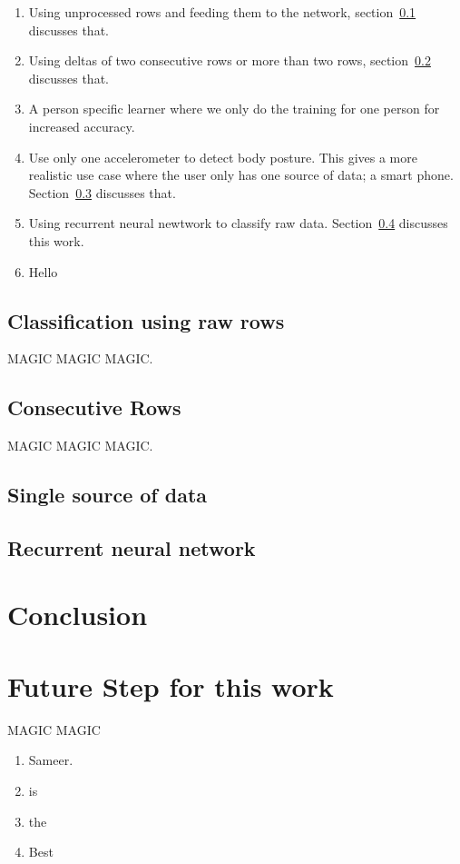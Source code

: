 \documentclass{article}
\begin{document}
\begin{enumerate}
  \item Using unprocessed rows and feeding them to the network, section~\ref{simple_rows} discusses that.
  \item Using deltas of two consecutive  rows or more than two rows, section~\ref{consecutive_rows} discusses that. 
  \item A person specific learner where we only do the training for one person for increased accuracy. 
  \item Use only one accelerometer to detect body posture. This gives a more realistic use case where the user only 
        has one source of data; a smart phone. Section~\ref{single_acc} discusses that.
  \item Using recurrent neural newtwork to classify raw data. Section~\ref{rec_neural} discusses this work.
  \item Hello 
\end{enumerate}  

\subsection{Classification using raw rows}
\label{simple_rows}
MAGIC MAGIC MAGIC.

\subsection{Consecutive Rows}
\label{consecutive_rows}
MAGIC MAGIC MAGIC.

\subsection{Single source of data} 
\label{single_acc}

\subsection{Recurrent neural network}
\label{rec_neural}

\section {Conclusion}
\label{conclusion}

\section{Future Step for this work}
MAGIC MAGIC 

\begin{enumerate}
  \item Sameer.  
  \item is  
  \item the 
  \item Best
\end{enumerate}

{}

\end{document}
